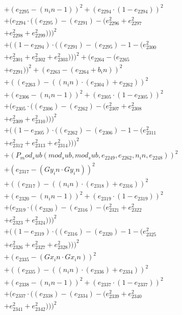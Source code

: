 \documentclass[10pt, a4paper]{article}
\begin{document}
\begin{small}
\begin{align*}
& + (e_{2295} - (n_in - 1))^{2} + (e_{2294}  \cdot  (1 - e_{2294}))^{2} \\
& + (e_{2294}  \cdot  ((e_{2295}) - (e_{2291}) - (e_{2296}^{2} + e_{2297}^{2} \\
& + e_{2298}^{2} + e_{2299}^{2})))^{2} \\
& + ((1 - e_{2294})  \cdot  ((e_{2291}) - (e_{2295}) - 1 - (e_{2300}^{2} \\
& + e_{2301}^{2} + e_{2302}^{2} + e_{2303}^{2})))^{2} + (e_{2264} - (e_{2265} \\
& + e_{2291}))^{2} + (e_{2263} - (e_{2264} + b_in))^{2} \\
& + ((e_{2263}) - ((n_in)  \cdot  (e_{2304}) + e_{2262}))^{2} \\
& + (e_{2306} - (n_in - 1))^{2} + (e_{2305}  \cdot  (1 - e_{2305}))^{2} \\
& + (e_{2305}  \cdot  ((e_{2306}) - (e_{2262}) - (e_{2307}^{2} + e_{2308}^{2} \\
& + e_{2309}^{2} + e_{2310}^{2})))^{2} \\
& + ((1 - e_{2305})  \cdot  ((e_{2262}) - (e_{2306}) - 1 - (e_{2311}^{2} \\
& + e_{2312}^{2} + e_{2313}^{2} + e_{2314}^{2})))^{2} \\
& + (P_mod_sub(mod_sub, mod_sub, e_{2249}, e_{2262}, n_in, e_{2248}))^{2} \\
& + (e_{2317} - (Gy_in  \cdot  Gy_in))^{2} \\
& + ((e_{2317}) - ((n_in)  \cdot  (e_{2318}) + e_{2316}))^{2} \\
& + (e_{2320} - (n_in - 1))^{2} + (e_{2319}  \cdot  (1 - e_{2319}))^{2} \\
& + (e_{2319}  \cdot  ((e_{2320}) - (e_{2316}) - (e_{2321}^{2} + e_{2322}^{2} \\
& + e_{2323}^{2} + e_{2324}^{2})))^{2} \\
& + ((1 - e_{2319})  \cdot  ((e_{2316}) - (e_{2320}) - 1 - (e_{2325}^{2} \\
& + e_{2326}^{2} + e_{2327}^{2} + e_{2328}^{2})))^{2} \\
& + (e_{2335} - (Gx_in  \cdot  Gx_in))^{2} \\
& + ((e_{2335}) - ((n_in)  \cdot  (e_{2336}) + e_{2334}))^{2} \\
& + (e_{2338} - (n_in - 1))^{2} + (e_{2337}  \cdot  (1 - e_{2337}))^{2} \\
& + (e_{2337}  \cdot  ((e_{2338}) - (e_{2334}) - (e_{2339}^{2} + e_{2340}^{2} \\
& + e_{2341}^{2} + e_{2342}^{2})))^{2} \\

\end{align*}
\end{small}
\end{document}
